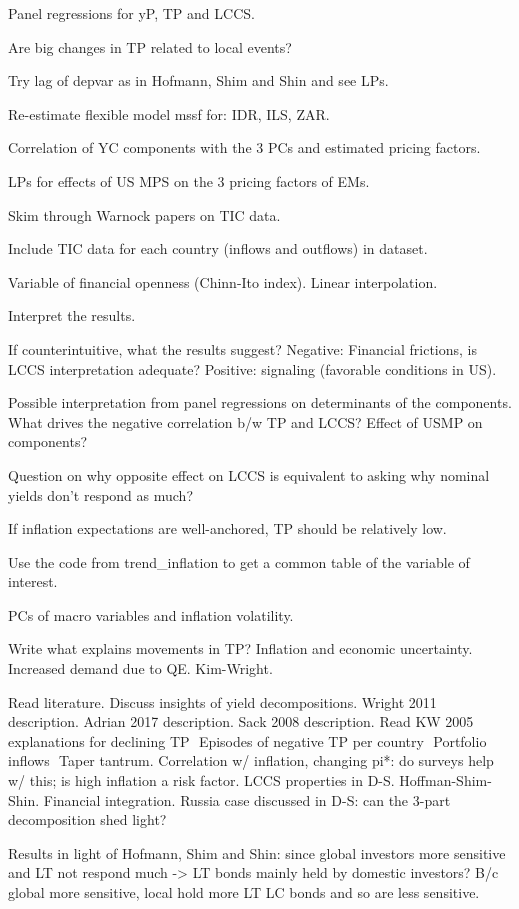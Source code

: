\documentclass[12pt]{article}
\newcommand{\cmark}{\ding{51}}
\newcommand{\done}{\rlap{$\square$}{\raisebox{2pt}{\large\hspace{1pt}\cmark}}%
	\hspace{-2.5pt}}
\begin{document}
\begin{todolist}
\begin{todolist}
		\item Panel regressions for yP, TP and LCCS.
		\item Are big changes in TP related to local events?
		\item Try lag of depvar as in Hofmann, Shim and Shin and see LPs.
		\item Re-estimate flexible model mssf for: IDR, ILS, ZAR.
		\item Correlation of YC components with the 3 PCs and estimated pricing factors.
		\item LPs for effects of US MPS on the 3 pricing factors of EMs.
		\item Skim through Warnock papers on TIC data.
		\item Include TIC data for each country (inflows and outflows) in dataset.
		\item Variable of financial openness (Chinn-Ito index). Linear interpolation.
	\end{todolist}
	\item Interpret the results.
	\begin{todolist}
		\item If counterintuitive, what the results suggest? Negative: Financial frictions, is LCCS interpretation adequate? Positive: signaling (favorable conditions in US).
		\item Possible interpretation from panel regressions on determinants of the components. What drives the negative correlation b/w TP and LCCS? Effect of USMP on components?
		\item Question on why opposite effect on LCCS is equivalent to asking why nominal yields don't respond as much?
		\item If inflation expectations are well-anchored, TP should be relatively low.
		\item[\done] Use the code from trend_inflation to get a common table of the variable of interest.
		\item PCs of macro variables and inflation volatility.
		\item Write what explains movements in TP? Inflation and economic uncertainty. Increased demand due to QE. Kim-Wright.
		\item Read literature. Discuss insights of yield decompositions. Wright 2011 description. Adrian 2017 description. Sack 2008 description. Read KW 2005 explanations for declining TP \(<->\) Episodes of negative TP per country \(<->\) Portfolio inflows \(<->\) Taper tantrum. Correlation w/ inflation, changing pi*: do surveys help w/ this; is high inflation a risk factor. LCCS properties in D-S. Hoffman-Shim-Shin. Financial integration. Russia case discussed in D-S: can the 3-part decomposition shed light?
		\item Results in light of Hofmann, Shim and Shin: since global investors more sensitive and LT not respond much -> LT bonds mainly held by domestic investors? B/c global more sensitive, local hold more LT LC bonds and so are less sensitive.
	\end{todolist}
	

\end{todolist}
\end{document}
